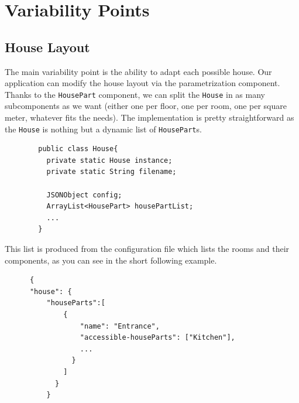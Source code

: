   \section{Variability Points}
    \subsection{House Layout}
      The main variability point is the ability to adapt each possible house. Our application can modify the house layout via the parametrization component. Thanks to the \texttt{HousePart} component, we can split the \texttt{House} in as many subcomponents as we want (either one per floor, one per room, one per square meter, whatever fits the needs). The implementation is pretty straightforward as the \texttt{House} is nothing but a dynamic list of \texttt{HousePart}s.
      \begin{verbatim}
        public class House{
          private static House instance;
          private static String filename;

          JSONObject config;
          ArrayList<HousePart> housePartList;
          ...
        }
      \end{verbatim}
      This list is produced from the configuration file which lists the rooms and their components, as you can see in the short following example.
      \begin{verbatim}
      {
      "house": {
          "houseParts":[
              {
                  "name": "Entrance",
                  "accessible-houseParts": ["Kitchen"],
                  ...
                }
              ]
            }
          }
      \end{verbatim}

